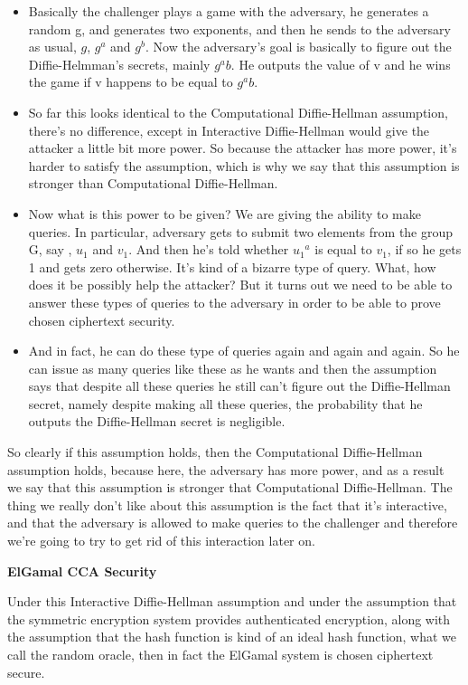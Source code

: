 \documentclass[11pt]{article}
\providecommand{\tightlist}{%
      \setlength{\itemsep}{0pt}\setlength{\parskip}{0pt}}
\begin{document}
\begin{itemize}
\tightlist
\item
  Basically the challenger plays a game with the adversary, he generates
  a random g, and generates two exponents, and then he sends to the
  adversary as usual, \(g\), \(g^a\) and \(g^b\). Now the adversary's
  goal is basically to figure out the Diffie-Helmman's secrets, mainly
  \(g^ab\). He outputs the value of v and he wins the game if v happens
  to be equal to \(g^ab\). 
\item
  So far this looks identical to the Computational Diffie-Hellman
  assumption, there's no difference, except in Interactive
  Diffie-Hellman would give the attacker a little bit more power. So
  because the attacker has more power, it's harder to satisfy the
  assumption, which is why we say that this assumption is stronger than
  Computational Diffie-Hellman. 
\item
  Now what is this power to be given? We are giving the ability to make
  queries. In particular, adversary gets to submit two elements from the
  group G, say , \(u_1\) and \(v_1\). And then he's told whether
  \({u_1}^a\) is equal to \(v_1\), if so he gets 1 and gets zero
  otherwise. It's kind of a bizarre type of query. What, how does it be
  possibly help the attacker? But it turns out we need to be able to
  answer these types of queries to the adversary in order to be able to
  prove chosen ciphertext security.
\item
  And in fact, he can do these type of queries again and again and
  again. So he can issue as many queries like these as he wants and then
  the assumption says that despite all these queries he still can't
  figure out the Diffie-Hellman secret, namely despite making all these
  queries, the probability that he outputs the Diffie-Hellman secret is
  negligible.
\end{itemize}

So clearly if this assumption holds, then the Computational
Diffie-Hellman assumption holds, because here, the adversary has more
power, and as a result we say that this assumption is stronger that
Computational Diffie-Hellman. The thing we really don't like about this
assumption is the fact that it's interactive, and that the adversary is
allowed to make queries to the challenger and therefore we're going to
try to get rid of this interaction later on.

\textbf{ElGamal CCA Security}

Under this Interactive Diffie-Hellman assumption and under the
assumption that the symmetric encryption system provides authenticated
encryption, along with the assumption that the hash function is kind of
an ideal hash function, what we call the random oracle, then in fact the
ElGamal system is chosen ciphertext secure.
\end{document}
